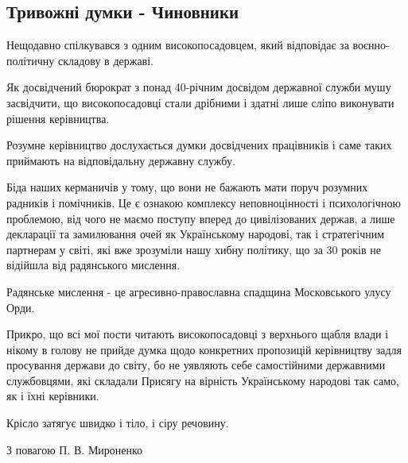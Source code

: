  
 
 
 
 

\subsection{Тривожні думки - Чиновники}

Нещодавно спілкувався з одним високопосадовцем, який відповідає за
воєнно-політичну складову в державі.

Як досвідчений бюрократ з понад 40-річним досвідом державної служби мушу
засвідчити, що високопосадовці стали дрібними і здатні лише сліпо виконувати
рішення керівництва.

Розумне керівництво дослухається думки досвідчених працівників і саме таких
приймають на відповідальну державну службу. 

Біда наших керманичів у тому, що вони не бажають мати поруч розумних радників і
помічників. Це є ознакою комплексу неповноцінності і психологічною проблемою,
від чого не маємо поступу вперед до цивілізованих держав, а лише декларації та
замилювання очей як Українському народові, так і стратегічним партнерам у
світі, які вже зрозуміли нашу хибну політику, що за 30 років не відійшла від
радянського мислення.

Радянське мислення - це агресивно-православна спадщина Московського улусу Орди.

Прикро, що всі мої пости читають високопосадовці з верхнього щабля влади і
нікому в голову не прийде думка щодо конкретних пропозицій керівництву задля
просування держави до світу, бо не уявляють себе самостійними державними
службовцями, які складали Присягу на вірність Українському народові так само,
як і їхні керівники. 

Крісло затягує швидко і тіло, і сіру речовину.

З повагою П. В. Мироненко
